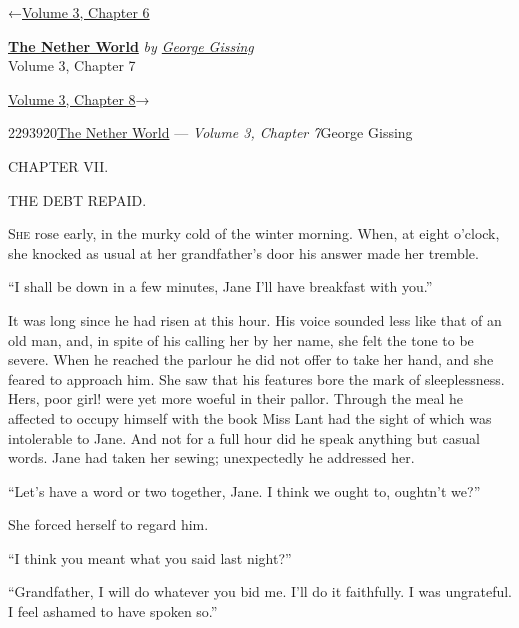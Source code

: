 \hypertarget{headerContainer}{}
\hypertarget{navigationHeader}{}
\protect\hypertarget{headerprevious}{}{←\href{/wiki/The_Nether_World/Volume_3/Chapter_6}{Volume
3, Chapter 6}}

\textbf{\protect\hypertarget{header_title_text}{}{\href{/wiki/The_Nether_World}{The
Nether World}}} \emph{by
\href{/wiki/Author:George_Gissing}{\protect\hypertarget{header_author_text}{}{{George
Gissing}}}}\\
\protect\hypertarget{header_section_text}{}{Volume 3, Chapter 7}

\protect\hypertarget{headernext}{}{\href{/wiki/The_Nether_World/Volume_3/Chapter_8}{Volume
3, Chapter 8}→}

\hypertarget{navigationNotes}{}

\hypertarget{ws-data}{}
\protect\hypertarget{ws-article-id}{}{2293920}\protect\hypertarget{ws-title}{}{\href{/wiki/The_Nether_World}{The
Nether World} --- \emph{Volume 3, Chapter
7}}\protect\hypertarget{ws-author}{}{George Gissing}

{\protect\hypertarget{136}{}{}}

{CHAPTER VII.}

THE DEBT REPAID.

\textsc{She} rose early, in the murky cold of the winter morning. When,
at eight o'clock, she knocked as usual at her grandfather's door his
answer made her tremble.

``I shall be down in a few minutes, Jane I'll have breakfast with you.''

It was long since he had risen at this hour. His voice sounded less like
that of an old man, and, in spite of his calling her by her name, she
felt the tone to be severe. When he reached the parlour he did not offer
to take her hand, and she feared to approach him. She saw that his
features bore the mark of sleeplessness. Hers, poor girl! were yet more
woeful in their pallor. Through the meal he affected to occupy himself
with the book Miss Lant had {\protect\hypertarget{137}{}{}}the sight of
which was intolerable to Jane. And not for a full hour did he speak
anything but casual words. Jane had taken her sewing; unexpectedly he
addressed her.

``Let's have a word or two together, Jane. I think we ought to, oughtn't
we?''

She forced herself to regard him.

``I think you meant what you said last night?''

``Grandfather, I will do whatever you bid me. I'll do it faithfully. I
was ungrateful. I feel ashamed to have spoken so.''


